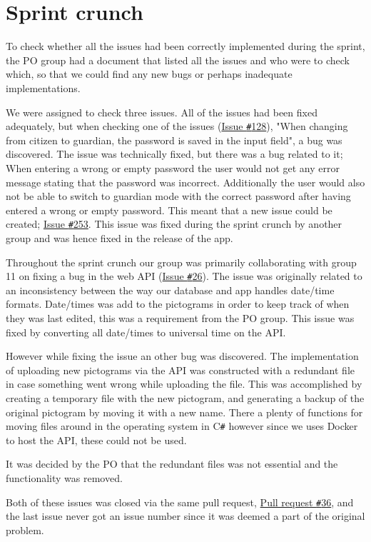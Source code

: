 \section{Sprint crunch}
To check whether all the issues had been correctly implemented during the sprint, the PO group had a document that listed all the issues and who were to check which, so that we could find any new bugs or perhaps inadequate implementations.

We were assigned to check three issues.
All of the issues had been fixed adequately, but when checking one of the issues (\href{https://github.com/aau-giraf/weekplanner/issues/128}{Issue \texttt{\#}128}), "When changing from citizen to guardian, the password is saved in the input field", a bug was discovered.
The issue was technically fixed, but there was a bug related to it; When entering a wrong or empty password the user would not get any error message stating that the password was incorrect.
Additionally the user would also not be able to switch to guardian mode with the correct password after having entered a wrong or empty password.
This meant that a new issue could be created; \href{https://github.com/aau-giraf/weekplanner/issues/253}{Issue \texttt{\#}253}.
This issue was fixed during the sprint crunch by another group and was hence fixed in the release of the app.

Throughout the sprint crunch our group was primarily collaborating with group 11 on fixing a bug in the web API (\href{https://github.com/aau-giraf/web-api/issues/26}{Issue \texttt{\#}26}).
The issue was originally related to an inconsistency between the way our database and app handles date/time formats. 
Date/times was add to the pictograms in order to keep track of when they was last edited, this was a requirement from the PO group. 
This issue was fixed by converting all date/times to universal time on the API. 

However while fixing the issue an other bug was discovered.
The implementation of uploading new pictograms via the API was constructed with a redundant file in case something went wrong while uploading the file. 
This was accomplished by creating a temporary file with the new pictogram, and generating a backup of the original pictogram by moving it with a new name. 
There a plenty of functions for moving files around in the operating system in C\texttt{\#} however since we uses Docker to host the API, these could not be used. 

It was decided by the PO that the redundant files was not essential and the functionality was removed.

Both of these issues was closed via the same pull request, \href{https://github.com/aau-giraf/web-api/pull/36}{Pull request \texttt{\#}36}, and the last issue never got an issue number since it was deemed a part of the original problem. 